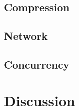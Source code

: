 \documentclass[b5paper,10pt,twoside]{book}
\begin{document}
{\section{Compression}
\section{Network}
\section{Concurrency}

\chapter{Discussion}

}

{
}
\end{document}
